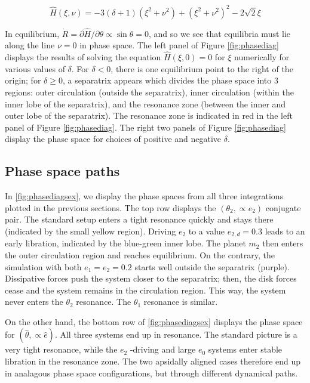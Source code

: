 \documentclass{mnras}
\renewcommand{\d}{\partial}
\begin{document}
\begin{equation}
  \hat H(\xi,\nu) = -3(\delta+1)(\xi^2+\nu^2) + (\xi^2+\nu^2)^2 -2\sqrt2
  \xi
\end{equation}

In equilibrium, \(\dot R = \d\hat H/\d\theta \propto \sin\theta= 0\),
and so we see that equilibria must lie along the line \(\nu=0\) in phase
space.  The left panel of Figure \ref{fig:phasediag} displays the
results of solving the equation \(\hat H(\xi, 0) = 0\) for \(\xi\)
numerically for various values of \(\delta\).  For \(\delta<0\), there is
one equilibrium point to the right of the origin; for \(\delta \geq 0\),
a separatrix appears which divides the phase space into 3 regions:
outer circulation (outside the separatrix), inner circulation (within
the inner lobe of the separatrix), and the resonance zone (between the
inner and outer lobe of the separatrix).  The resonance zone is
indicated in red in the left panel of Figure \ref{fig:phasediag}.  The
right two panels of Figure \ref{fig:phasediag} display the phase space
for choices of positive and negative \(\delta\).

\subsection{Phase space paths}
\label{sec:org39cf48a}
\begin{figure*}
  \centering
  \texttt{[image: \{./relative-geometry]}.png}
  \caption{ }
  \label{fig:relgeom}
\end{figure*}
In \ref{fig:phasediagsex}, we display the phase spaces from all three
integrations plotted in the previous sections.
The top row displays the \((\theta_2, \propto e_2)\) conjugate pair.
The standard setup enters a tight resonance quickly and stays there (indicated by the small yellow region).
Driving \(e_2\) to a value \(e_{2,d}=0.3\) leads to an early libration, indicated by the blue-green inner lobe.
The planet \(m_2\) then enters the outer circulation region and reaches equilibrium.
On the contrary, the simulation with both \(e_1 = e_2 = 0.2\) starts well outside the separatrix (purple).
Dissipative forces push the system closer to the separatrix; then, the disk forces cease
and the system remains in the circulation region. This way, the system never enters the \(\theta_2\)
resonance. The \(\theta_1\) resonance is similar.

On the other hand, the bottom row of \ref{fig:phasediagsex} displays the
phase space for \((\hat\theta,\propto \hat e)\).
All three systems end up in resonance. The standard picture is a very tight resonance, while the
\(e_2\) -driving and large \(e_0\) systems enter stable libration in the resonance zone.
The two apsidally aligned cases therefore end up in analagous phase space configurations, but
through different dynamical paths.
\end{document}
